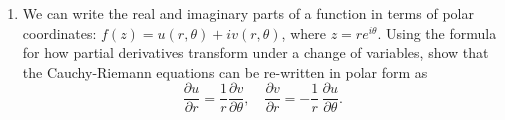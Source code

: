 \documentclass[10pt,a4paper]{article}
\begin{document}
\begin{enumerate}
\item
  We can write the real and imaginary parts of a function in terms of
  polar coordinates: $f(z) = u(r,\theta) + i v(r,\theta)$, where $z =
  re^{i\theta}$. Using the formula for how partial derivatives
  transform under a change of variables, show that the Cauchy-Riemann
  equations can be re-written in polar form as
  \begin{equation}
    \frac{\partial u}{\partial r} =  \frac{1}{r} \frac{\partial v}{\partial \theta}, \quad \frac{\partial v}{\partial r} =  - \frac{1}{r}\,  \frac{\partial u}{\partial \theta}.
  \end{equation}
\end{enumerate}
\end{document}
